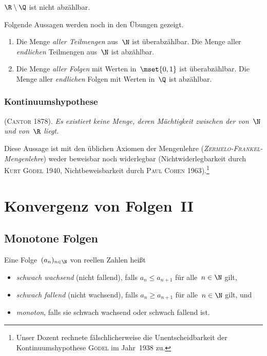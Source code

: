 \documentclass[a4paper]{article}
\begin{document}
\begin{corollary}
    $\R \setminus \Q$ ist nicht abzählbar.
\end{corollary}

\begin{remark}
    Folgende Aussagen werden noch in den Übungen gezeigt.
    \begin{enumerate}
        \item Die Menge \emph{aller Teilmengen} aus~$\N$ ist überabzählbar. Die Menge aller \emph{endlichen} Teilmengen aus~$\N$ ist abzählbar.
        \item Die Menge \emph{aller Folgen} mit Werten in~$\mset{0, 1}$ ist überabzählbar. Die Menge aller \emph{endlichen} Folgen mit Werten in~$\Q$ ist abzählbar.
    \end{enumerate}
\end{remark}

\subsubsection{Kontinuumshypothese}

(\textsc{Cantor} 1878). \emph{Es existiert keine Menge, deren Mächtigkeit zwischen der von~$\N$ und von~$\R$ liegt.}

Diese Aussage ist mit den üblichen Axiomen der Mengenlehre (\emph{\textsc{Zermelo}-\textsc{Frankel}-Mengenlehre}) weder beweisbar noch widerlegbar (Nichtwiderlegbarkeit durch \textsc{Kurt Gödel} 1940, Nichtbeweisbarkeit durch \textsc{Paul Cohen} 1963).\footnote{Unser Dozent rechnete fälschlicherweise die Unentscheidbarkeit der Kontinuumshypothese \textsc{Gödel} im Jahr~1938 zu.}

\section{Konvergenz von Folgen~II}

\subsection{Monotone Folgen}

\begin{definition}
    Eine Folge~$(a_n)_{n\in\N}$ von reellen Zahlen heißt
    \begin{itemize}
        \item \emph{schwach wachsend} (nicht fallend), falls $a_n \leq a_{n+1}$ für alle~$n \in \N$ gilt,
        \item \emph{schwach fallend} (nicht wachsend), falls $a_n \geq a_{n+1}$ für alle~$n \in \N$ gilt, und
        \item \emph{monoton}, falls sie schwach wachsend oder schwach fallend ist.
    \end{itemize}
\end{definition}
\end{document}
